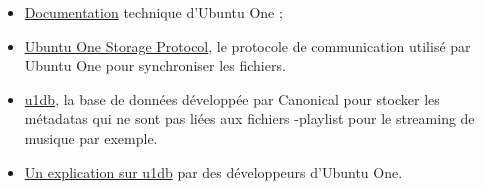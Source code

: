 \begin{itemize}
\renewcommand{\labelitemi}{$\bullet$}
\item \href{https://wiki.ubuntu.com/UbuntuOne/TechnicalDetails}{Documentation} technique d'Ubuntu One ;
\item \href{http://bazaar.launchpad.net/~ubuntuone-control-tower/ubuntuone-storage-protocol/trunk/files}{Ubuntu One Storage Protocol}, le protocole de communication utilisé par Ubuntu One pour synchroniser les fichiers.
\item \href{https://one.ubuntu.com/developer/data/u1db/index}{u1db}, la base de données développée par Canonical pour stocker les métadatas qui ne sont pas liées aux fichiers -playlist pour le streaming de musique par exemple.
\item \href{https://github.com/onitu/Epitech.EIP/wiki/Discussion-du-03-03-13-avec-Chipaca-sur-\%23u1db}{Un explication sur u1db} par des développeurs d'Ubuntu One.
\end{itemize}
